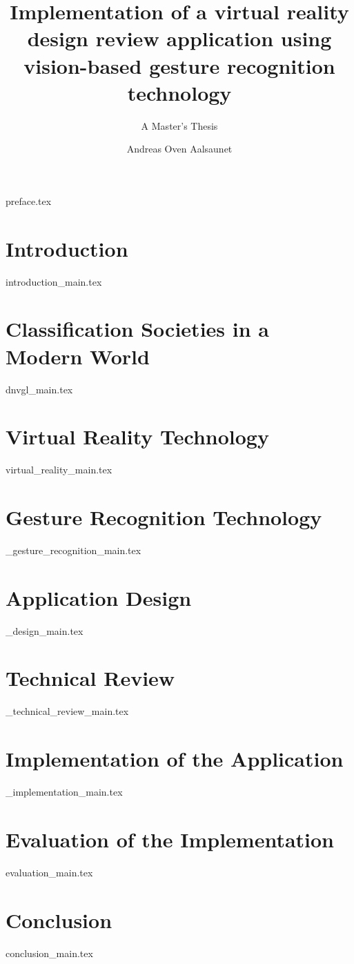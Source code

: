 \documentclass[UKenglish]{ifimaster}
\title{Implementation of a virtual reality design review application using vision-based gesture recognition technology}
\subtitle{A Master's Thesis}
\author{Andreas Oven Aalsaunet}
\begin{document}
\duoforside[dept={Department of Informatics}, program={Programming and Networks}, long]                                        

{preface.tex}

\frontmatter{}                 
\tableofcontents{}
\listoffigures{}
\listoftables{}

\mainmatter{}
  
\chapter{Introduction}  
\label{chapter:introduction}
{introduction_main.tex}

\chapter{Classification Societies in a Modern World}
\label{chapter:dnvgl}
{dnvgl_main.tex}

\chapter{Virtual Reality Technology}
\label{chapter:vr}
{virtual_reality_main.tex}

\chapter{Gesture Recognition Technology}
\label{chapter:grt}
{_gesture_recognition_main.tex}

\chapter{Application Design}
\label{chapter:design}
{_design_main.tex}

\chapter{Technical Review}
\label{chapter:technical}
{_technical_review_main.tex}

\chapter{Implementation of the Application}
\label{chapter:implementation}
{_implementation_main.tex}

\chapter{Evaluation of the Implementation}
\label{chapter:evaluation}
{evaluation_main.tex}

\chapter{Conclusion}
\label{chapter:conclusion}
{conclusion_main.tex}

\backmatter{}


\end{document}
